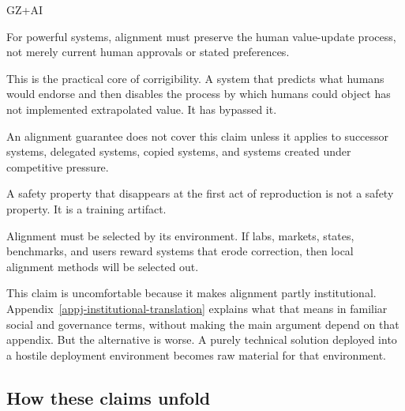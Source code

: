 \begin{authbar}{GZ+AI}
\begin{introclaim}
\label{claim:correction}
For powerful systems, alignment must preserve the human value-update process, not merely current human approvals or stated preferences.
\end{introclaim}

This is the practical core of corrigibility.
A system that predicts what humans would endorse and then disables the process by which humans could object has not implemented extrapolated value.
It has bypassed it.

\begin{introclaim}
\label{claim:successor}
An alignment guarantee does not cover this claim unless it applies to successor systems, delegated systems, copied systems, and systems created under competitive pressure.
\end{introclaim}

A safety property that disappears at the first act of reproduction is not a safety property.
It is a training artifact.

\begin{introclaim}
\label{claim:basin}
Alignment must be selected by its environment.
If labs, markets, states, benchmarks, and users reward systems that erode correction, then local alignment methods will be selected out.
\end{introclaim}

This claim is uncomfortable because it makes alignment partly institutional.
Appendix~\ref{appj-institutional-translation} explains what that means in familiar social and governance terms, without making the main argument depend on that appendix.
But the alternative is worse.
A purely technical solution deployed into a hostile deployment environment becomes raw material for that environment.
\end{authbar}

\authbarsubneedspace
\subsection*{How these claims unfold}
\label{sec:how-claims-unfold}

